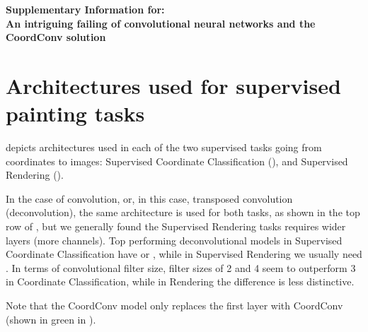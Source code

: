 \documentclass{article}
\newcommand{\titl}{An intriguing failing of convolutional neural networks and the CoordConv solution}
\begin{document}
\beginsupplementary



\noindent\makebox[\linewidth]{\rule{\linewidth}{3.5pt}}

\begin{center}
	{\LARGE \bf Supplementary Information for:\\ \titl\par}
\end{center}
\noindent\makebox[\linewidth]{\rule{\linewidth}{1pt}}

\section{Architectures used for supervised painting tasks}

 depicts architectures used in each of the two supervised tasks going from coordinates to images: Supervised Coordinate Classification (), and Supervised Rendering ().

In the case of convolution, or, in this case, transposed convolution (deconvolution), the same architecture is used for both tasks, as shown in the top row of , but we generally found the Supervised Rendering tasks requires wider layers (more channels). Top performing deconvolutional models in Supervised Coordinate Classification have  or , while in Supervised Rendering we usually need . In terms of convolutional filter size, filter sizes of 2 and 4 seem to outperform 3 in Coordinate Classification, while in Rendering the difference is less distinctive.

Note that the CoordConv model only replaces the first layer with CoordConv (shown in green in  ).













\end{document}

